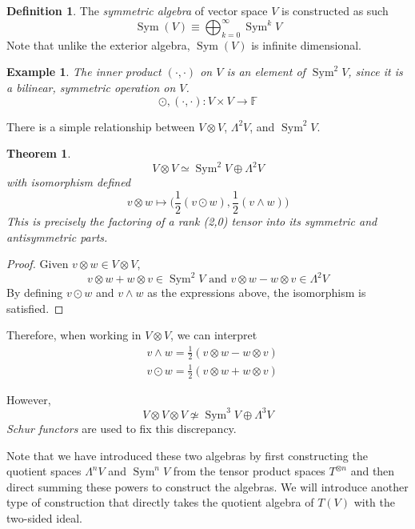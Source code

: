 \documentclass{article}
\DeclareMathOperator{\Sym}{Sym}
\newtheorem{theorem}{Theorem}[section]
\newtheorem{example}{Example}[section]
\theoremstyle{remark}
\theoremstyle{definition}
\newtheorem{definition}{Definition}[section]
\begin{document}
    \begin{definition}
    The \textit{symmetric algebra} of vector space $V$ is constructed as such 
    \[\Sym (V) \equiv \bigoplus_{k=0}^\infty \Sym^k V\]
    Note that unlike the exterior algebra, $\Sym(V)$ is infinite dimensional. 
    \end{definition}

    \begin{example}
    The inner product $(\cdot, \cdot)$ on $V$ is an element of $\Sym^2 V$, since it is a bilinear, symmetric operation on $V$. 
    \[\odot, (\cdot, \cdot): V \times V \longrightarrow \mathbb{F}\]
    \end{example}

    There is a simple relationship between $V \otimes V$, $\Lambda^2 V$, and $\Sym^2 V$. 

    \begin{theorem}
    \[V \otimes V \simeq \Sym^2 V \oplus \Lambda^2 V\]
    with isomorphism defined
    \[v \otimes w \mapsto \Big( \frac{1}{2} (v \odot w), \frac{1}{2} (v \wedge w) \Big)\]
    This is precisely the factoring of a rank (2,0) tensor into its symmetric and antisymmetric parts. 
    \end{theorem}
    \begin{proof}
    Given $v \otimes w \in V \otimes V$, 
    \[v \otimes w + w \otimes v \in \Sym^2 V \text{ and } v \otimes w - w \otimes v \in \Lambda^2 V\]
    By defining $v \odot w$ and $v \wedge w$ as the expressions above, the isomorphism is satisfied. 
    \end{proof}

    Therefore, when working in $V \otimes V$, we can interpret 
    \begin{align*}
        & v \wedge w = \frac{1}{2} (v \otimes w - w \otimes v) \\
        & v \odot w = \frac{1}{2} (v \otimes w + w \otimes v) 
    \end{align*}

    However, 
    \[V \otimes V \otimes V \not\simeq \Sym^3 V \oplus \Lambda^3 V\]
    \textit{Schur functors} are used to fix this discrepancy. 

    Note that we have introduced these two algebras by first constructing the quotient spaces $\Lambda^n V$ and $\Sym ^n V$ from the tensor product spaces $T^{\otimes n}$ and then direct summing these powers to construct the algebras. We will introduce another type of construction that directly takes the quotient algebra of $T(V)$ with the two-sided ideal. 
\end{document}
